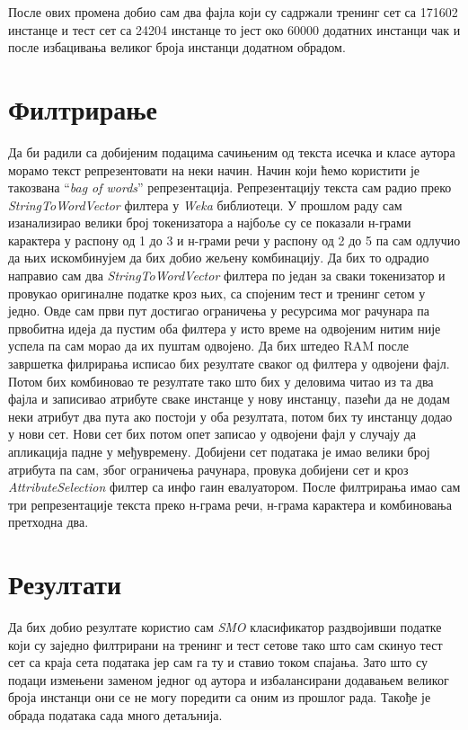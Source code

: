 \documentclass[11pt]{article}
\begin{document}
После ових промена добио сам два фајла који су садржали тренинг сет са 171602 инстанце и тест сет са 24204 инстанце то јест око 60000 додатних инстанци чак и после избацивања великог броја инстанци додатном обрадом.
\newpage
\section{Филтрирање}
Да би радили са добијеним подацима сачињеним од текста исечка и класе аутора морамо текст репрезентовати на неки начин. Начин који ћемо користити је такозвана ``\emph{bag of words}'' репрезентација. Репрезентацију текста сам радио преко \emph{StringToWordVector} филтера у \emph{Weka} библиотеци. У прошлом раду сам изанализирао велики број токенизатора а најбоље су се показали н-грами карактера у распону од 1 до 3 и н-грами речи у распону од 2 до 5 па сам одлучио да њих искомбинујем да бих добио жељену комбинацију. Да бих то одрадио направио сам два \emph{StringToWordVector} филтера по један за сваки токенизатор и провукао оригиналне податке кроз њих, са спојеним тест и тренинг сетом у једно. Овде сам први пут достигао ограничења у ресурсима мог рачунара па првобитна идеја да пустим оба филтера у исто време на одвојеним нитим није успела па сам морао да их пуштам одвојено. Да бих штедео RAM после завршетка филрирања исписао бих резултате сваког од филтера у одвојени фајл. Потом бих комбиновао те резултате тако што бих у деловима читао из та два фајла и записивао атрибуте сваке инстанце у нову инстанцу, пазећи да не додам неки атрибут два пута ако постоји у оба резултата, потом бих ту инстанцу додао у нови сет. Нови сет бих потом опет записао у одвојени фајл у случају да апликација падне у међувремену. Добијени сет података је имао велики број атрибута па сам, због ограничења рачунара, провука добијени сет и кроз \emph{AttributeSelection} филтер са инфо гаин евалуатором. После филтрирања имао сам три репрезентације текста преко н-грама речи, н-грама карактера и комбиновања претходна два. 

\newpage
\section{Резултати}
Да бих добио резултате користио сам  \emph{SMO} класификатор раздвојивши податке који су заједно филтрирани на тренинг и тест сетове тако што сам скинуо тест сет са краја сета података јер сам га ту и ставио током спајања. Зато што су подаци измењени заменом једног од аутора и избалансирани додавањем великог броја инстанци они се не могу поредити са оним из прошлог рада. Такође је обрада података сада много детаљнија.
\end{document}
